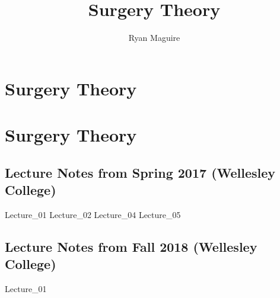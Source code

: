 \documentclass[crop=false,class=book,oneside]{standalone}
\begin{document}
    \newif\ifmathcoursessurgery
    \ifx\ifmathcourses\undefined
        \title{Surgery Theory}
        \author{Ryan Maguire}
        \date{\vspace{-5ex}}
        \maketitle
        \tableofcontents
        \listoffigures
        \clearpage
        \chapter*{Surgery Theory}
        \setcounter{chapter}{1}
    \else
        \chapter{Surgery Theory}
    \fi
    \section{Lecture Notes from Spring 2017 (Wellesley College)}
        {Lecture_01}
        {Lecture_02}
        {Lecture_04}
        {Lecture_05}
    \section{Lecture Notes from Fall 2018 (Wellesley College)}
        {Lecture_01}
\end{document}
